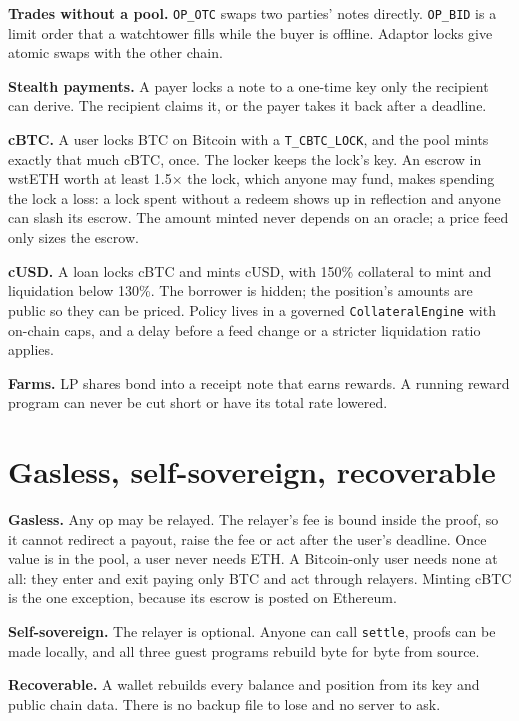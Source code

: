\documentclass[11pt,letterpaper]{article}
\newcommand{\op}[1]{\texttt{#1}}
\begin{document}
\textbf{Trades without a pool.} \op{OP\_OTC} swaps two parties' notes directly. \op{OP\_BID} is a limit order that a
watchtower fills while the buyer is offline. Adaptor locks give atomic swaps with the other chain.

\textbf{Stealth payments.} A payer locks a note to a one-time key only the recipient can derive. The recipient
claims it, or the payer takes it back after a deadline.

\textbf{cBTC.} A user locks BTC on Bitcoin with a \op{T\_CBTC\_\allowbreak{}LOCK}, and the pool mints exactly that much cBTC,
once. The locker keeps the lock's key. An escrow in wstETH worth at least 1.5$\times$ the lock, which anyone may
fund, makes spending the lock a loss: a lock spent without a redeem shows up in reflection and anyone can
slash its escrow. The amount minted never depends on an oracle; a price feed only sizes the escrow.

\textbf{cUSD.} A loan locks cBTC and mints cUSD, with 150\% collateral to mint and liquidation below 130\%. The
borrower is hidden; the position's amounts are public so they can be priced. Policy lives in a governed
\op{CollateralEngine} with on-chain caps, and a delay before a feed change or a stricter liquidation ratio
applies.

\textbf{Farms.} LP shares bond into a receipt note that earns rewards. A running reward program can never be
cut short or have its total rate lowered.

\section{Gasless, self-sovereign, recoverable}

\textbf{Gasless.} Any op may be relayed. The relayer's fee is bound inside the proof, so it cannot redirect a
payout, raise the fee or act after the user's deadline. Once value is in the pool, a user never needs
ETH. A Bitcoin-only user needs none at all: they enter and exit paying only BTC and act through
relayers. Minting cBTC is the one exception, because its escrow is posted on Ethereum.

\textbf{Self-sovereign.} The relayer is optional. Anyone can call \op{settle}, proofs can be made locally, and
all three guest programs rebuild byte for byte from source.

\textbf{Recoverable.} A wallet rebuilds every balance and position from its key and public chain data. There
is no backup file to lose and no server to ask.
\end{document}
